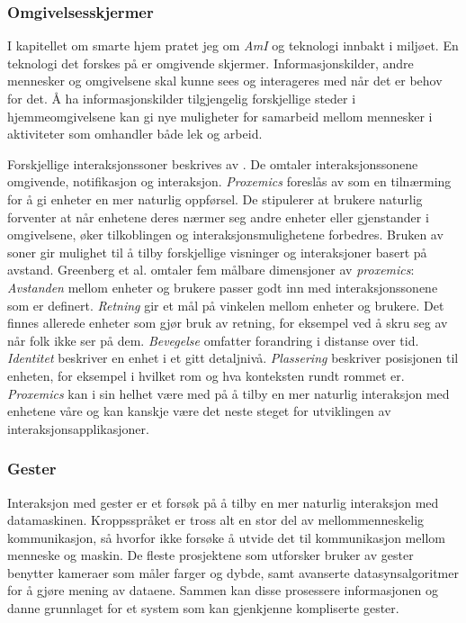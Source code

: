 \subsubsection*{Omgivelsesskjermer}
I kapitellet om smarte hjem pratet jeg om \emph{AmI} og teknologi innbakt i miljøet. En teknologi det forskes på er omgivende skjermer. Informasjonskilder, andre mennesker og omgivelsene skal kunne sees og interageres med når det er behov for det. Å ha informasjonskilder tilgjengelig forskjellige steder i hjemmeomgivelsene kan gi nye muligheter for samarbeid mellom mennesker i aktiviteter som omhandler både lek og arbeid.

Forskjellige interaksjonssoner beskrives av \citet{streitz05}. De omtaler interaksjonssonene omgivende, notifikasjon og interaksjon. \emph{Proxemics} foreslås av \citet{greenberg11} som en tilnærming for å gi enheter en mer naturlig oppførsel. De stipulerer at brukere naturlig forventer at når enhetene deres nærmer seg andre enheter eller gjenstander i omgivelsene, øker tilkoblingen og interaksjonsmulighetene forbedres. Bruken av soner gir mulighet til å tilby forskjellige visninger og interaksjoner basert på avstand. Greenberg et al. omtaler fem målbare dimensjoner av \emph{proxemics}: \emph{Avstanden} mellom enheter og brukere passer godt inn med interaksjonssonene som er definert. \emph{Retning} gir et mål på vinkelen mellom enheter og brukere. Det finnes allerede enheter som gjør bruk av retning, for eksempel ved å skru seg av når folk ikke ser på dem. \emph{Bevegelse} omfatter forandring i distanse over tid. \emph{Identitet} beskriver en enhet i et gitt detaljnivå. \emph{Plassering} beskriver posisjonen til enheten, for eksempel i hvilket rom og hva konteksten rundt rommet er. \emph{Proxemics} kan i sin helhet være med på å tilby en mer naturlig interaksjon med enhetene våre og kan kanskje være det neste steget for utviklingen av interaksjonsapplikasjoner.

\subsubsection*{Gester}
Interaksjon med gester er et forsøk på å tilby en mer naturlig interaksjon med datamaskinen. Kroppsspråket er tross alt en stor del av mellommenneskelig kommunikasjon, så hvorfor ikke forsøke å utvide det til kommunikasjon mellom menneske og maskin.
De fleste prosjektene som utforsker bruker av gester benytter kameraer som måler farger og dybde, samt avanserte datasynsalgoritmer for å gjøre mening av dataene. Sammen kan disse prosessere informasjonen og danne grunnlaget for et system som kan gjenkjenne kompliserte gester.

